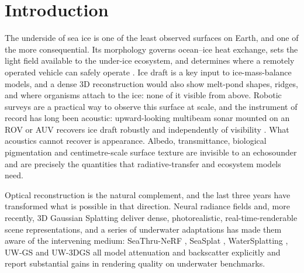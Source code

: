 \documentclass[conference]{IEEEtran}
\begin{document}
\section{Introduction}

The underside of sea ice is one of the least observed surfaces on Earth, and
one of the more consequential. Its morphology governs ocean--ice heat exchange,
sets the light field available to the under-ice ecosystem, and determines
where a remotely operated vehicle can safely operate \cite{wadhams-2006,
katlein-2017}. Ice draft is a key input to ice-mass-balance models, and a dense 3D
reconstruction would also show melt-pond shapes, ridges, and where
organisms attach to the ice: none of it visible from above.
Robotic surveys are a practical way to observe this surface at
scale, and the instrument of record has long been acoustic: upward-looking
multibeam sonar mounted on an ROV or AUV recovers ice draft robustly and
independently of visibility \cite{anhaus-2024, sonar_mapping}. What acoustics
cannot recover is appearance. Albedo, transmittance, biological pigmentation
and centimetre-scale surface texture are invisible to an echosounder
and are precisely the quantities that radiative-transfer and ecosystem models
need.

Optical reconstruction is the natural complement, and the last three years
have transformed what is possible in that direction. Neural radiance fields
\cite{mildenhall2020nerf} and, more recently, 3D Gaussian Splatting
\cite{kerbl20233dgs} deliver dense, photorealistic, real-time-renderable scene
representations, and a series of underwater adaptations has made them aware of
the intervening medium: SeaThru-NeRF \cite{levy2023seathrunerf}, SeaSplat
\cite{yang2025seasplat}, WaterSplatting \cite{li2025watersplatting}, UW-GS
\cite{wang2025uwgs} and UW-3DGS \cite{xing2025uw3dgs} all model attenuation and
backscatter explicitly and report substantial gains in rendering quality on
underwater benchmarks.
\end{document}
